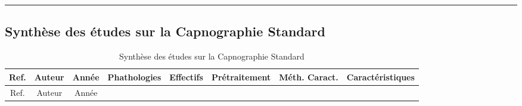\documentclass[12pt,]{article}
\begin{document}
\newpage
\begin{landscape}

\begin{center}\rule{0.5\linewidth}{\linethickness}\end{center}

\hypertarget{synthese-des-etudes-sur-la-capnographie-standard}{%
\subsection{Synthèse des études sur la Capnographie
Standard}\label{synthese-des-etudes-sur-la-capnographie-standard}}

\begin{longtable}[]{@{}ccccclll@{}}
\caption{Synthèse des études sur la Capnographie
Standard}\tabularnewline
\toprule
\begin{minipage}[b]{0.14\columnwidth}\centering
Ref.\strut
\end{minipage} & \begin{minipage}[b]{0.09\columnwidth}\centering
Auteur\strut
\end{minipage} & \begin{minipage}[b]{0.08\columnwidth}\centering
Année\strut
\end{minipage} & \begin{minipage}[b]{0.11\columnwidth}\centering
Phathologies\strut
\end{minipage} & \begin{minipage}[b]{0.08\columnwidth}\centering
Effectifs\strut
\end{minipage} & \begin{minipage}[b]{0.09\columnwidth}\raggedright
Prétraitement\strut
\end{minipage} & \begin{minipage}[b]{0.08\columnwidth}\raggedright
Méth. Caract.\strut
\end{minipage} & \begin{minipage}[b]{0.11\columnwidth}\raggedright
Caractéristiques\strut
\end{minipage}\tabularnewline
\midrule
\endfirsthead
\toprule
\begin{minipage}[b]{0.14\columnwidth}\centering
Ref.\strut
\end{minipage} & \begin{minipage}[b]{0.09\columnwidth}\centering
Auteur\strut
\end{minipage} & \begin{minipage}[b]{0.08\columnwidth}\centering
Année\strut
\end{minipage} & \begin{minipage}[b]{0.11\columnwidth}\centering

\end{minipage}
\end{longtable}
\end{landscape}
\end{document}
